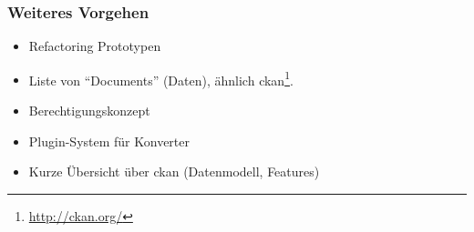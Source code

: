 \documentclass[class=scrbook,crop=false]{standalone}
\begin{document}
	\subsubsection*{Weiteres Vorgehen}
	\begin{itemize}
		\item Refactoring Prototypen
		\item Liste von ``Documents'' (Daten), ähnlich ckan\footnote{\url{http://ckan.org/}}.
		\item Berechtigungskonzept
		\item Plugin-System für Konverter
		\item Kurze Übersicht über ckan (Datenmodell, Features)
	\end{itemize}
	
\end{document}
